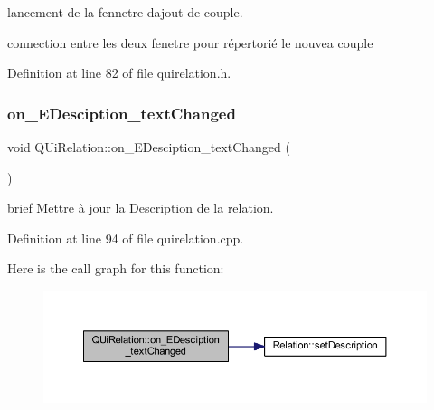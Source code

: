 lancement de la fennetre d\textquotesingle{}ajout de couple. 

connection entre les deux fenetre pour répertorié le nouvea couple 

Definition at line 82 of file quirelation.\+h.

\mbox{\label{class_q_ui_relation_a092e6a03e3ca7b4f6bb061d6b618edb0}} 
\subsubsection{\texorpdfstring{on\+\_\+\+E\+Desciption\+\_\+text\+Changed}{on\_EDesciption\_textChanged}}
{\footnotesize\ttfamily void Q\+Ui\+Relation\+::on\+\_\+\+E\+Desciption\+\_\+text\+Changed (\begin{DoxyParamCaption}{ }\end{DoxyParamCaption})\hspace{0.3cm}{\ttfamily [slot]}}

brief Mettre à jour la Description de la relation. 

Definition at line 94 of file quirelation.\+cpp.

Here is the call graph for this function\+:\nopagebreak
\begin{figure}[H]
\begin{center}
\leavevmode
\includegraphics[width=350pt]{class_q_ui_relation_a092e6a03e3ca7b4f6bb061d6b618edb0_cgraph}
\end{center}
\end{figure}
\mbox{\label{class_q_ui_relation_aa21c9863da04b78e380733a49542c98b}} 
